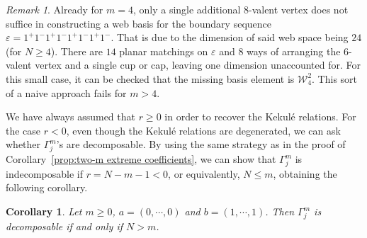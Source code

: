 \documentclass[12pt]{amsart}
\newtheorem{corollary}[theorem]{Corollary}
\theoremstyle{definition}
\theoremstyle{remark}
\newtheorem{remark}[theorem]{Remark}
\numberwithin{equation}{section}
\numberwithin{figure}{section}
\begin{document}
\begin{remark}
    Already for $m=4$, only a single additional $8$-valent vertex does not suffice in constructing a web basis for the boundary sequence $\varepsilon = 1^+ 1^-1^+ 1^-1^+ 1^-1^+ 1^-$. That is due to the dimension of said web space being $24$ (for $N \geq 4$). There are $14$ planar matchings on $\varepsilon$ and $8$ ways of arranging the $6$-valent vertex and a single cup or cap, leaving one dimension unaccounted for. For this small case, it can be checked that the missing basis element is $\mathcal{W}_4^2$. This sort of a naive approach fails for $m > 4$. 
\end{remark}

We have always assumed that $r\geq0$ in order to recover the Kekulé relations. For the case $r<0$, even though the Kekulé relations are degenerated, we can ask whether $\Gamma^m_j$'s are decomposable. By using the same strategy as in the proof of Corollary~\ref{prop:two-m extreme coefficients}, we can show that $\Gamma^m_j$ is indecomposable if $r=N-m-1<0$, or equivalently, $N\leq m$, obtaining the following corollary.

\begin{corollary}
    Let $m\geq0$, $a=(0,\cdots,0)$ and $b=(1,\cdots,1)$. Then $\Gamma^m_j$ is decomposable if and only if $N>m$. 
\end{corollary}

\end{document}

